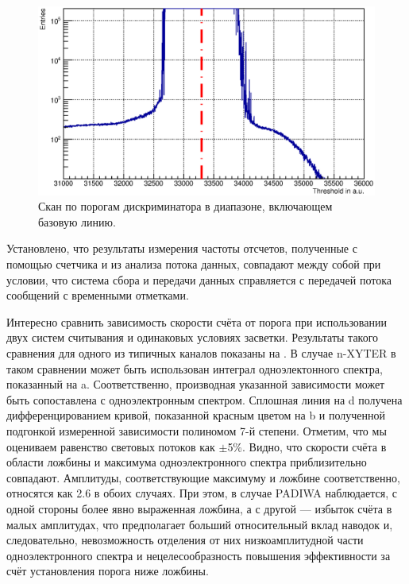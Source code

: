 

\begin{figure}
\includegraphics[width=1.0\textwidth]{pictures/31_cMean12.eps}
\caption{Скан по порогам дискриминатора в диапазоне, включающем базовую линию.}
\label{fig:TDCscalerScan}
\end{figure}

Установлено, что результаты измерения частоты отсчетов, полученные с помощью счетчика и из анализа потока данных, совпадают между собой при условии, что система сбора и передачи данных справляется с передачей потока сообщений с временными отметками.

Интересно сравнить зависимость скорости счёта от порога при использовании двух систем считывания и одинаковых условиях засветки. Результаты такого сравнения для одного из типичных каналов показаны на . В случае n-XYTER в таком сравнении может быть использован интеграл одноэлектонного спектра, показанный на a. Соответственно, производная указанной зависимости может быть сопоставлена с одноэлектронным спектром. Сплошная линия на d получена дифференцированием кривой, показанной красным цветом на b и полученной подгонкой измеренной зависимости полиномом 7-й степени. Отметим, что мы оцениваем равенство световых потоков как $ \pm $5\%. Видно, что скорости счёта в области ложбины и максимума одноэлектронного спектра приблизительно совпадают. Амплитуды, соответствующие максимуму и ложбине соответственно, относятся как 2.6 в обоих случаях. При этом, в случае PADIWA наблюдается, с одной стороны более явно выраженная ложбина, а с другой --- избыток счёта в малых амплитудах, что предполагает больший относительный вклад наводок и, следовательно, невозможность отделения от них низкоамплитудной части одноэлектронного спектра и нецелесообразность повышения эффективности за счёт установления порога ниже ложбины.

